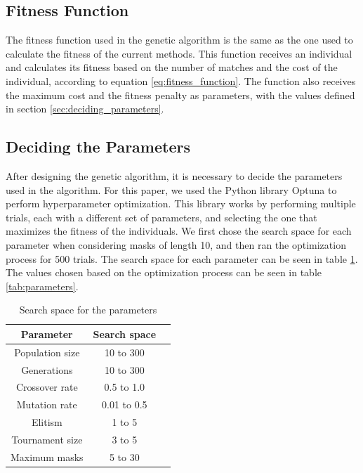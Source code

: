 \documentclass[sigconf,authordraft]{acmart}
\begin{document}
\subsection{Fitness Function}

The fitness function used in the genetic algorithm is the same as the one used to calculate the fitness of the current methods.
This function receives an individual and calculates its fitness based on the number of matches and the cost of the individual, according to equation \ref{eq:fitness_function}.
The function also receives the maximum cost and the fitness penalty as parameters, with the values defined in section \ref{sec:deciding_parameters}.

\subsection{Deciding the Parameters}

After designing the genetic algorithm, it is necessary to decide the parameters used in the algorithm.
For this paper, we used the Python library Optuna \cite{optuna} to perform hyperparameter optimization.
This library works by performing multiple trials, each with a different set of parameters, and selecting the one that maximizes the fitness of the individuals.
We first chose the search space for each parameter when considering masks of length 10, and then ran the optimization process for 500 trials.
The search space for each parameter can be seen in table \ref{tab:search_space}.
The values chosen based on the optimization process can be seen in table \ref{tab:parameters}.

\begin{table}
  \caption{Search space for the parameters}
  \label{tab:search_space}
  \begin{tabular}{ccl}
    \toprule
    Parameter & Search space \\
    \midrule
    Population size & 10 to 300 \\
    Generations & 10 to 300 \\
    Crossover rate & 0.5 to 1.0 \\
    Mutation rate & 0.01 to 0.5 \\
    Elitism & 1 to 5 \\
    Tournament size & 3 to 5 \\
    Maximum masks & 5 to 30 \\
    \bottomrule
  \end{tabular}
\end{table}
\end{document}
